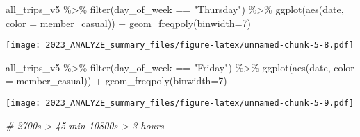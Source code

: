 \documentclass[
]{article}
\newenvironment{Shaded}{\begin{snugshade}}{\end{snugshade}}
\newcommand{\AttributeTok}[1]{\textcolor[rgb]{0.77,0.63,0.00}{#1}}
\newcommand{\CommentTok}[1]{\textcolor[rgb]{0.56,0.35,0.01}{\textit{#1}}}
\newcommand{\DecValTok}[1]{\textcolor[rgb]{0.00,0.00,0.81}{#1}}
\newcommand{\FunctionTok}[1]{\textcolor[rgb]{0.00,0.00,0.00}{#1}}
\newcommand{\NormalTok}[1]{#1}
\newcommand{\SpecialCharTok}[1]{\textcolor[rgb]{0.00,0.00,0.00}{#1}}
\newcommand{\StringTok}[1]{\textcolor[rgb]{0.31,0.60,0.02}{#1}}
\begin{document}
\begin{Shaded}
\begin{Highlighting}[]
\NormalTok{all\_trips\_v5 }\SpecialCharTok{\%\textgreater{}\%} 
  \FunctionTok{filter}\NormalTok{(day\_of\_week }\SpecialCharTok{==} \StringTok{"Thursday"}\NormalTok{) }\SpecialCharTok{\%\textgreater{}\%}
\FunctionTok{ggplot}\NormalTok{(}\FunctionTok{aes}\NormalTok{(date, }\AttributeTok{color =}\NormalTok{ member\_casual)) }\SpecialCharTok{+} 
  \FunctionTok{geom\_freqpoly}\NormalTok{(}\AttributeTok{binwidth=}\DecValTok{7}\NormalTok{)}
\end{Highlighting}
\end{Shaded}

\texttt{[image: 2023\_ANALYZE\_summary\_files/figure-latex/unnamed-chunk-5-8.pdf]}

\begin{Shaded}
\begin{Highlighting}[]
\NormalTok{all\_trips\_v5 }\SpecialCharTok{\%\textgreater{}\%} 
  \FunctionTok{filter}\NormalTok{(day\_of\_week }\SpecialCharTok{==} \StringTok{"Friday"}\NormalTok{) }\SpecialCharTok{\%\textgreater{}\%}
\FunctionTok{ggplot}\NormalTok{(}\FunctionTok{aes}\NormalTok{(date, }\AttributeTok{color =}\NormalTok{ member\_casual)) }\SpecialCharTok{+} 
  \FunctionTok{geom\_freqpoly}\NormalTok{(}\AttributeTok{binwidth=}\DecValTok{7}\NormalTok{)}
\end{Highlighting}
\end{Shaded}

\texttt{[image: 2023\_ANALYZE\_summary\_files/figure-latex/unnamed-chunk-5-9.pdf]}

\begin{Shaded}
\begin{Highlighting}[]
\CommentTok{\# 2700s \textgreater{} 45 min 10800s \textgreater{} 3 hours}
\end{Highlighting}
\end{Shaded}
\end{document}

